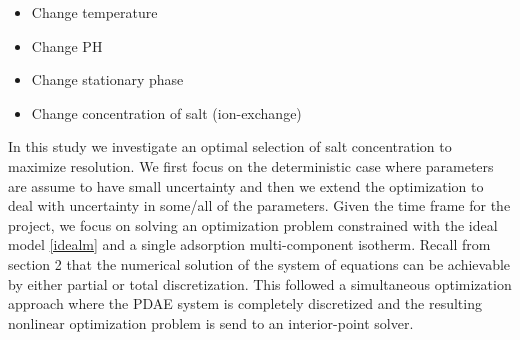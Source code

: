 \documentclass[paper=a4, fontsize=11pt]{scrartcl}
\begin{document}
\begin{itemize}
\item Change temperature
\item Change PH
\item Change stationary phase
\item Change concentration of salt (ion-exchange)
\end{itemize}

In this study we investigate an optimal selection of salt concentration to maximize resolution. We first focus on the deterministic case where parameters are assume to have small uncertainty and then we extend the optimization to deal with uncertainty in some/all of the parameters. Given the time frame for the project, we focus on solving an optimization problem constrained with the ideal model \eqref{idealm} and a single adsorption multi-component isotherm. Recall from section 2 that the numerical solution of the system of equations can be achievable by either partial or total discretization. This followed a simultaneous optimization approach where the PDAE system is completely discretized and the resulting nonlinear optimization problem is send to an interior-point solver.   
\end{document}
